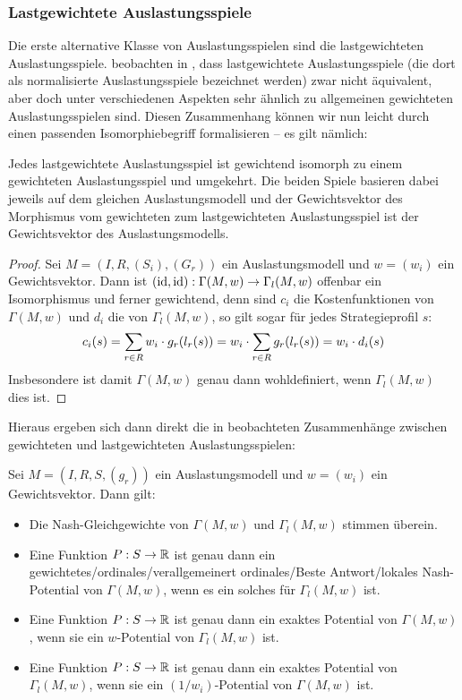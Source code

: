 \subsubsection{Lastgewichtete Auslastungsspiele}

Die erste alternative Klasse von Auslastungsspielen sind die lastgewichteten Auslastungsspiele. \citeauthor{CharExGewPotinWCG} beobachten in \cite[S. 53]{CharExGewPotinWCG}, dass lastgewichtete Auslastungsspiele (die dort als normalisierte Auslastungsspiele bezeichnet werden) zwar nicht äquivalent, aber doch unter verschiedenen Aspekten sehr ähnlich zu allgemeinen gewichteten Auslastungsspielen sind. Diesen Zusammenhang können wir nun leicht durch einen passenden Isomorphiebegriff formalisieren -- es gilt nämlich:

\begin{lemma}\label{lemma:lastgewAuslIsomGewAusl}
	Jedes lastgewichtete Auslastungsspiel ist gewichtend isomorph zu einem gewichteten Auslastungsspiel und umgekehrt. Die beiden Spiele basieren dabei jeweils auf dem gleichen Auslastungsmodell und der Gewichtsvektor des Morphismus vom gewichteten zum lastgewichteten Auslastungsspiel ist der Gewichtsvektor des Auslastungsmodells.
\end{lemma}

\begin{proof}
	Sei $M = (I, R, (S_i), (G_r))$ ein Auslastungsmodell und $w = (w_i)$ ein Gewichtsvektor. Dann ist $(\mathrm{id}, \mathrm{id}): \Gamma(M, w) \to \Gamma_l(M,w)$ offenbar ein Isomorphismus und ferner gewichtend, denn sind $c_i$ die Kostenfunktionen von $\Gamma(M, w)$ und $d_i$ die von $\Gamma_l(M,w)$, so gilt sogar für jedes Strategieprofil $s$:
		\[c_i(s) = \sum_{r \in R} w_i\cdot g_r(l_r(s)) = w_i \cdot \sum_{r \in R} g_r(l_r(s)) = w_i \cdot d_i(s) \qedhere\]
	Insbesondere ist damit $\Gamma(M, w)$ genau dann wohldefiniert, wenn $\Gamma_l(M, w)$ dies ist.
\end{proof}

Hieraus ergeben sich dann direkt die in \cite{CharExGewPotinWCG} beobachteten Zusammenhänge zwischen gewichteten und lastgewichteten Auslastungsspielen:

\begin{kor}
	Sei $M = (I, R, S, (g_r))$ ein Auslastungsmodell und $w = (w_i)$ ein Gewichtsvektor. Dann gilt:
	\begin{itemize}
		\item Die Nash-Gleichgewichte von $\Gamma(M, w)$ und $\Gamma_l(M,w)$ stimmen überein.
		\item Eine Funktion $P: S \to \mathbb{R}$ ist genau dann ein gewichtetes/ordinales/verallgemeinert ordinales/Beste Antwort/lokales Nash-Potential von $\Gamma(M, w)$, wenn es ein solches für $\Gamma_l(M,w)$ ist.
		\item Eine Funktion $P: S \to \mathbb{R}$ ist genau dann ein exaktes Potential von $\Gamma(M, w)$, wenn sie ein $w$-Potential von $\Gamma_l(M,w)$ ist.
		\item Eine Funktion $P: S \to \mathbb{R}$ ist genau dann ein exaktes Potential von $\Gamma_l(M, w)$, wenn sie ein $(1/w_i)$-Potential von $\Gamma(M,w)$ ist.		
	\end{itemize}
\end{kor}

